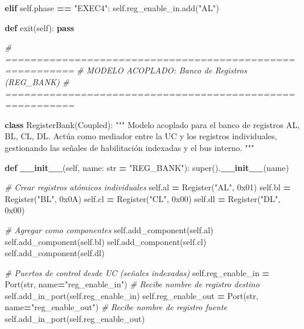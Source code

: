 \documentclass[12pt,oneside]{templates/unerthesis}
\newenvironment{Shaded}{\begin{snugshade}}{\end{snugshade}}
\newcommand{\BaseNTok}[1]{\textcolor[rgb]{0.00,0.00,0.81}{#1}}
\newcommand{\BuiltInTok}[1]{#1}
\newcommand{\CommentTok}[1]{\textcolor[rgb]{0.56,0.35,0.01}{\textit{#1}}}
\newcommand{\ControlFlowTok}[1]{\textcolor[rgb]{0.13,0.29,0.53}{\textbf{#1}}}
\newcommand{\FunctionTok}[1]{\textcolor[rgb]{0.13,0.29,0.53}{\textbf{#1}}}
\newcommand{\KeywordTok}[1]{\textcolor[rgb]{0.13,0.29,0.53}{\textbf{#1}}}
\newcommand{\NormalTok}[1]{#1}
\newcommand{\OperatorTok}[1]{\textcolor[rgb]{0.81,0.36,0.00}{\textbf{#1}}}
\newcommand{\StringTok}[1]{\textcolor[rgb]{0.31,0.60,0.02}{#1}}
\newcommand{\VariableTok}[1]{\textcolor[rgb]{0.00,0.00,0.00}{#1}}
\begin{document}
\begin{Shaded}
\begin{Highlighting}[]
        \ControlFlowTok{elif} \VariableTok{self}\NormalTok{.phase }\OperatorTok{==} \StringTok{"EXEC4"}\NormalTok{:}
            \VariableTok{self}\NormalTok{.reg\_enable\_in.add(}\StringTok{"AL"}\NormalTok{)}
    
    \KeywordTok{def}\NormalTok{ exit(}\VariableTok{self}\NormalTok{):}
        \ControlFlowTok{pass}


\CommentTok{\# =========================================================}
\CommentTok{\# MODELO ACOPLADO: Banco de Registros (REG\_BANK)}
\CommentTok{\# =========================================================}

\KeywordTok{class}\NormalTok{ RegisterBank(Coupled):}
    \StringTok{"""}
\StringTok{    Modelo acoplado para el banco de registros AL, BL, CL, DL.}
\StringTok{    Actúa como mediador entre la UC y los registros individuales,}
\StringTok{    gestionando las señales de habilitación indexadas y el bus interno.}
\StringTok{    """}
    
    \KeywordTok{def} \FunctionTok{\_\_init\_\_}\NormalTok{(}\VariableTok{self}\NormalTok{, name: }\BuiltInTok{str} \OperatorTok{=} \StringTok{"REG\_BANK"}\NormalTok{):}
        \BuiltInTok{super}\NormalTok{().}\FunctionTok{\_\_init\_\_}\NormalTok{(name)}
        
        \CommentTok{\# Crear registros atómicos individuales}
        \VariableTok{self}\NormalTok{.al }\OperatorTok{=}\NormalTok{ Register(}\StringTok{"AL"}\NormalTok{, }\BaseNTok{0x01}\NormalTok{)}
        \VariableTok{self}\NormalTok{.bl }\OperatorTok{=}\NormalTok{ Register(}\StringTok{"BL"}\NormalTok{, }\BaseNTok{0x0A}\NormalTok{)}
        \VariableTok{self}\NormalTok{.cl }\OperatorTok{=}\NormalTok{ Register(}\StringTok{"CL"}\NormalTok{, }\BaseNTok{0x00}\NormalTok{)}
        \VariableTok{self}\NormalTok{.dl }\OperatorTok{=}\NormalTok{ Register(}\StringTok{"DL"}\NormalTok{, }\BaseNTok{0x00}\NormalTok{)}
        
        \CommentTok{\# Agregar como componentes}
        \VariableTok{self}\NormalTok{.add\_component(}\VariableTok{self}\NormalTok{.al)}
        \VariableTok{self}\NormalTok{.add\_component(}\VariableTok{self}\NormalTok{.bl)}
        \VariableTok{self}\NormalTok{.add\_component(}\VariableTok{self}\NormalTok{.cl)}
        \VariableTok{self}\NormalTok{.add\_component(}\VariableTok{self}\NormalTok{.dl)}
        
        \CommentTok{\# Puertos de control desde UC (señales indexadas)}
        \VariableTok{self}\NormalTok{.reg\_enable\_in }\OperatorTok{=}\NormalTok{ Port(}\BuiltInTok{str}\NormalTok{, name}\OperatorTok{=}\StringTok{"reg\_enable\_in"}\NormalTok{)}
        \CommentTok{\# Recibe nombre de registro destino}
        \VariableTok{self}\NormalTok{.add\_in\_port(}\VariableTok{self}\NormalTok{.reg\_enable\_in)}
        \VariableTok{self}\NormalTok{.reg\_enable\_out }\OperatorTok{=}\NormalTok{ Port(}\BuiltInTok{str}\NormalTok{, name}\OperatorTok{=}\StringTok{"reg\_enable\_out"}\NormalTok{)  }
        \CommentTok{\# Recibe nombre de registro fuente}
        \VariableTok{self}\NormalTok{.add\_in\_port(}\VariableTok{self}\NormalTok{.reg\_enable\_out)}
        

\end{Highlighting}
\end{Shaded}
\end{document}
